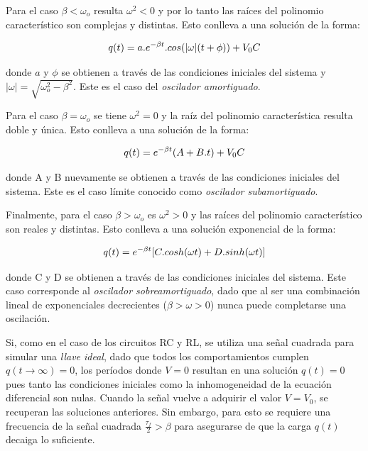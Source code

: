 \documentclass[11pt,a4paper]{article}
\begin{document}
Para el caso $\beta < \omega_o$ resulta $\omega^2 < 0$ y por lo tanto las raíces del polinomio característico son complejas y distintas. Esto conlleva a una solución de la forma:

\begin{equation}{\label{amort}}
q(t) = a.e^{-\beta t}.cos(|\omega|(t+\phi)) + V_0C
\end{equation}

donde $a$ y $\phi$ se obtienen a través de las condiciones iniciales del sistema y $|\omega| = \sqrt{\omega_o^2-\beta^2}$. Este es el caso del \textit{oscilador amortiguado}.

Para el caso $\beta = \omega_o$ se tiene $\omega^2 = 0$ y la raíz del polinomio característica resulta doble y única. Esto conlleva a una solución de la forma:

\begin{equation}{\label{sub}}
q(t) = e^{-\beta t}(A+B.t) + V_0C
\end{equation}

donde A y B nuevamente se obtienen a través de las condiciones iniciales del sistema. Este es el caso límite conocido como \textit{oscilador subamortiguado}.

Finalmente, para el caso $\beta > \omega_o$ es $\omega^2>0$ y las raíces del polinomio característico son reales y distintas. Esto conlleva a una solución exponencial de la forma:

\begin{equation}{\label{sobre}}
q(t) = e^{-\beta t}[C.cosh(\omega t)+D.sinh(\omega t)]
\end{equation}

donde C y D se obtienen a través de las condiciones iniciales del sistema. Este caso corresponde al \textit{oscilador sobreamortiguado}, dado que al ser una combinación lineal de exponenciales decrecientes ($\beta > \omega > 0$) nunca puede completarse una oscilación. 

Si, como en el caso de los circuitos RC y RL, se utiliza una señal cuadrada para simular una \textit{llave ideal}, dado que todos los comportamientos cumplen $q(t\rightarrow\infty) = 0$, los períodos donde $V = 0$ resultan en una solución $q(t) = 0$ pues tanto las condiciones iniciales como la inhomogeneidad de la ecuación diferencial son nulas. Cuando la señal vuelve a adquirir el valor $V = V_0$, se recuperan las soluciones anteriores. Sin embargo, para esto se requiere una frecuencia de la señal cuadrada $\frac{\tau_f}{2} > \beta$ para asegurarse de que la carga $q(t)$ decaiga lo suficiente. 
\end{document}
